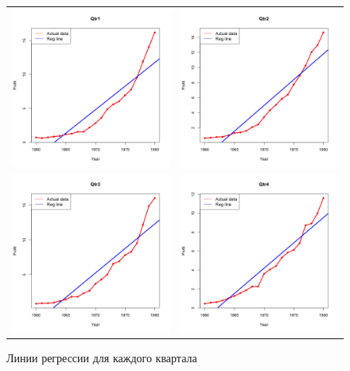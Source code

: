 \documentclass[]{article}
\numberwithin{equation}{section}
\begin{document}
    \begin{figure}[H]
        \centering
        \begin{tabular}{c c}
            \includegraphics[width = 0.4\linewidth]{data/JnJ_reg_line_qtr1.png} & \includegraphics[width = 0.4\linewidth]{data/JnJ_reg_line_qtr2.png} \\
            \includegraphics[width = 0.4\linewidth]{data/JnJ_reg_line_qtr3.png} & \includegraphics[width = 0.4\linewidth]{data/JnJ_reg_line_qtr4.png}
        \end{tabular}
        \vspace{-0.5cm}
        \caption{Линии регрессии для каждого квартала}
    \end{figure}
\end{document}
